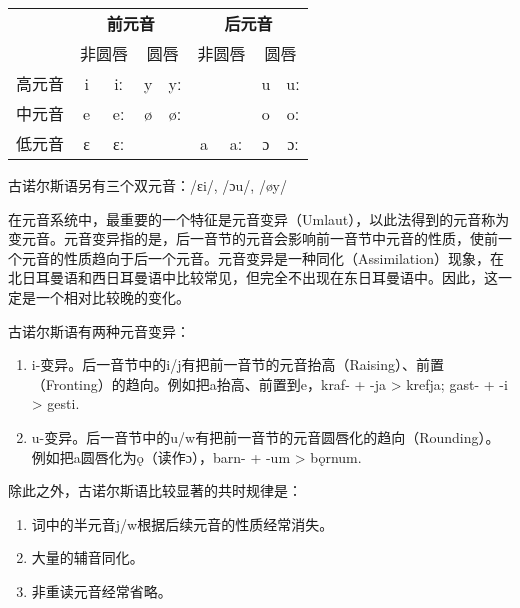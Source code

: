 \begin{table}[H]
\centering
\begin{tabular}{@{}ccccccccc@{}}
\toprule
    & \multicolumn{4}{c}{\textbf{前元音}}                          & \multicolumn{4}{c}{\textbf{后元音}}                          \\ \cmidrule(l){2-9} 
    & \multicolumn{2}{c}{非圆唇} & \multicolumn{2}{c}{圆唇} & \multicolumn{2}{c}{非圆唇} & \multicolumn{2}{c}{圆唇} \\ \cmidrule(l){2-9} 
高元音 & i          & iː         & y         & yː         &            &            & u         & uː         \\
中元音 & e          & eː         & ø         & øː         &            &            & o         & oː         \\
低元音 & ɛ          & ɛː         &           &            & a          & aː         & ɔ         & ɔː         \\ \bottomrule
\end{tabular}
\end{table}

古诺尔斯语另有三个双元音：/ɛi/, /ɔu/, /øy/

在元音系统中，最重要的一个特征是元音变异（Umlaut），以此法得到的元音称为变元音。元音变异指的是，后一音节的元音会影响前一音节中元音的性质，使前一个元音的性质趋向于后一个元音。元音变异是一种同化（Assimilation）现象，在北日耳曼语和西日耳曼语中比较常见，但完全不出现在东日耳曼语中。因此，这一定是一个相对比较晚的变化。

古诺尔斯语有两种元音变异：
\begin{enumerate}
    \item i-变异。后一音节中的i/j有把前一音节的元音抬高（Raising）、前置（Fronting）的趋向。例如把a抬高、前置到e，kraf- + -ja > krefja; gast- + -i > gesti.

    \item u-变异。后一音节中的u/w有把前一音节的元音圆唇化的趋向（Rounding）。例如把a圆唇化为ǫ（读作ɔ），barn- + -um > bǫrnum.
\end{enumerate}

除此之外，古诺尔斯语比较显著的共时规律是：
\begin{enumerate}
    \item 词中的半元音j/w根据后续元音的性质经常消失。

    \item 大量的辅音同化。

    \item 非重读元音经常省略。
\end{enumerate}

